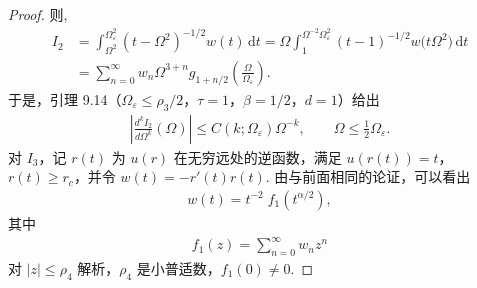 \begin{proof}
则,
\begin{align*}
  I_{2}
  &=\int_{\Omega^{2}}^{\Omega_{\varepsilon}^{2}}\left(t-\Omega^{2}\right)^{-1/2}w(t)\,\mathrm{d}t
  =\Omega\int_{1}^{\Omega^{-2}\Omega_{\varepsilon}^{2}}\left(t-1\right)^{-1/2}w\bigl(t\Omega^{2}\bigr)\,\mathrm{d}t\\
  &=\sum_{n=0}^{\infty}w_{n}\Omega^{3+n}g_{1+n/2}\left(\frac{\Omega}{\Omega_{\varepsilon}}\right).
\end{align*}
于是，引理 9.14（$\Omega_\varepsilon \leq \rho_3/2$，$\tau = 1$，$\beta = 1/2$，$d = 1$）给出
\begin{align*}
  \left|\frac{d^{k}I_{2}}{d\Omega^{k}}(\Omega)\right|\leq C(k;\Omega_{\varepsilon})\Omega^{-k},\qquad \Omega\leq\frac{1}{2}\Omega_{\varepsilon}.
\end{align*}
对 $I_{3}$，记 $r(t)$ 为 $u(r)$ 在无穷远处的逆函数，满足 $u(r(t)) = t$，$r(t) \geq r_{c}$，并令 $w(t) = -r'(t)r(t)$. 由与前面相同的论证，可以看出
\begin{align*}
  w(t)=t^{-2}\;f_{1}(t^{\alpha/2}),
\end{align*}
其中
\begin{align*}
  f_{1}(z)=\sum_{n=0}^{\infty}w_{n}z^{n}
\end{align*}
对 $|z| \leq \rho_4$ 解析，$\rho_4$ 是小普适数，$f_1(0) \neq 0$.


\end{proof}

